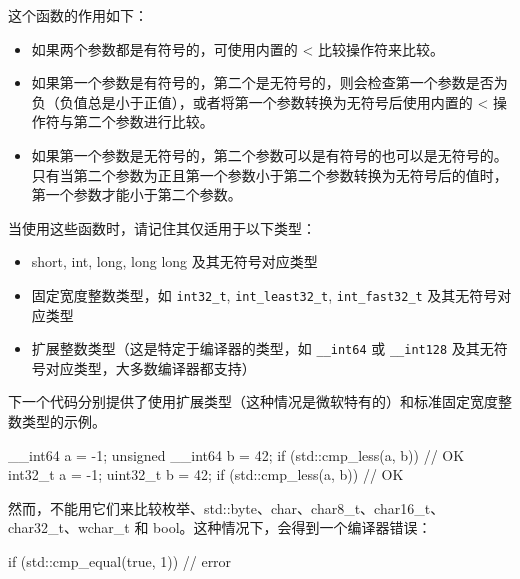 这个函数的作用如下：

\begin{itemize}
\item
如果两个参数都是有符号的，可使用内置的 < 比较操作符来比较。

\item
如果第一个参数是有符号的，第二个是无符号的，则会检查第一个参数是否为负（负值总是小于正值），或者将第一个参数转换为无符号后使用内置的 < 操作符与第二个参数进行比较。

\item
如果第一个参数是无符号的，第二个参数可以是有符号的也可以是无符号的。只有当第二个参数为正且第一个参数小于第二个参数转换为无符号后的值时，第一个参数才能小于第二个参数。
\end{itemize}

当使用这些函数时，请记住其仅适用于以下类型：

\begin{itemize}
\item
short, int, long, long long 及其无符号对应类型

\item
固定宽度整数类型，如 \verb|int32_t|, \verb|int_least32_t|, \verb|int_fast32_t| 及其无符号对应类型

\item
扩展整数类型（这是特定于编译器的类型，如 \verb|__int64| 或 \verb|__int128| 及其无符号对应类型，大多数编译器都支持）
\end{itemize}

下一个代码分别提供了使用扩展类型（这种情况是微软特有的）和标准固定宽度整数类型的示例。

\begin{cpp}
__int64 a = -1;
unsigned __int64 b = 42;
if (std::cmp_less(a, b))  // OK
{ }
int32_t  a = -1;
uint32_t b = 42;
if (std::cmp_less(a, b))  // OK
{ }
\end{cpp}

然而，不能用它们来比较枚举、std::byte、char、char8\_t、char16\_t、char32\_t、wchar\_t 和 bool。这种情况下，会得到一个编译器错误：

\begin{cpp}
if (std::cmp_equal(true, 1)) // error
{ }
\end{cpp}
